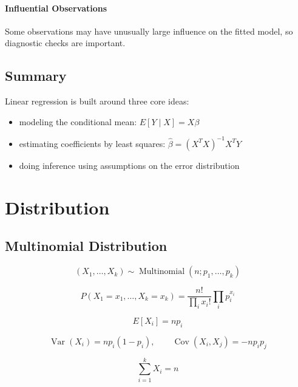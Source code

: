 \documentclass[a4paper,10pt]{article}
\begin{document}
\paragraph{Influential Observations}
Some observations may have unusually large influence on the fitted model, so diagnostic checks are important.

\subsection{Summary}

Linear regression is built around three core ideas:

\begin{itemize}
\item modeling the conditional mean: $E[Y\mid X]=X\beta$
\item estimating coefficients by least squares: $\hat\beta=(X^TX)^{-1}X^TY$
\item doing inference using assumptions on the error distribution
\end{itemize}

\section{Distribution}
\subsection{Multinomial Distribution}
$$
(X_1,\dots,X_k)
\sim
\operatorname{Multinomial}(n;p_1,\dots,p_k)
$$

$$
P(X_1=x_1,\dots,X_k=x_k)
=
\frac{n!}{\prod_i x_i!}
\prod_i p_i^{x_i}
$$

$$
E[X_i]=np_i
$$

$$
\operatorname{Var}(X_i)=np_i(1-p_i),
\qquad
\operatorname{Cov}(X_i,X_j)=-np_ip_j
$$

$$
\sum_{i=1}^k X_i=n
$$
\end{document}
